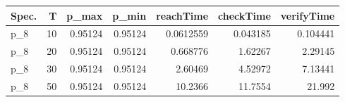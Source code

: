 \begin{tabular}{lrrrrrr}
\hline
 Spec.   &   T &   p\_max &   p\_min &   reachTime &   checkTime &   verifyTime \\
\hline
 p\_8     &  10 & 0.95124 & 0.95124 &   0.0612559 &    0.043185 &     0.104441 \\
 p\_8     &  20 & 0.95124 & 0.95124 &   0.668776  &    1.62267  &     2.29145  \\
 p\_8     &  30 & 0.95124 & 0.95124 &   2.60469   &    4.52972  &     7.13441  \\
 p\_8     &  50 & 0.95124 & 0.95124 &  10.2366    &   11.7554   &    21.992    \\
\hline
\end{tabular}
